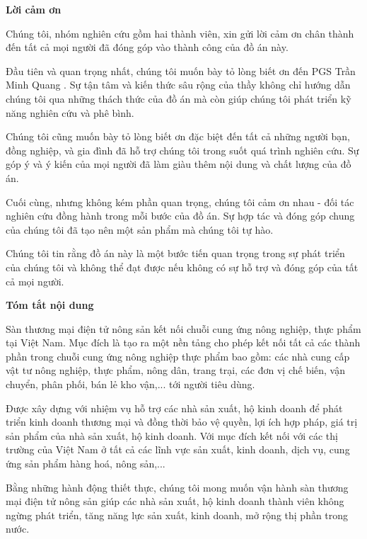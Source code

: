 \documentclass[12pt, a4paper]{report}
\theoremstyle{definition}
\newenvironment{acknowledgments}{
	\begin{center}
	  {\bfseries Lời cảm ơn}
	\end{center}
	\quotation
  }{}
\newenvironment{abstr}{
        \begin{center}
	{\bfseries Tóm tắt nội dung}
        \end{center}
        \quotation
    }{}
\newcommand{\Proc}{PGS Trần Minh Quang }
\begin{document}
\begin{acknowledgments}

Chúng tôi, nhóm nghiên cứu gồm hai thành viên, xin gửi lời cảm ơn chân thành đến tất cả mọi người đã đóng góp vào thành công của đồ án này.

Đầu tiên và quan trọng nhất, chúng tôi muốn bày tỏ lòng biết ơn đến \Proc. Sự tận tâm và kiến thức sâu rộng của thầy không chỉ hướng dẫn chúng tôi qua những thách thức của đồ án mà còn giúp chúng tôi phát triển kỹ năng nghiên cứu và phê bình.

Chúng tôi cũng muốn bày tỏ lòng biết ơn đặc biệt đến tất cả những người bạn, đồng nghiệp, và gia đình đã hỗ trợ chúng tôi trong suốt quá trình nghiên cứu. Sự góp ý và ý kiến của mọi người đã làm giàu thêm nội dung và chất lượng của đồ án.

Cuối cùng, nhưng không kém phần quan trọng, chúng tôi cảm ơn nhau - đối tác nghiên cứu đồng hành trong mỗi bước của đồ án. Sự hợp tác và đóng góp chung của chúng tôi đã tạo nên một sản phẩm mà chúng tôi tự hào.

Chúng tôi tin rằng đồ án này là một bước tiến quan trọng trong sự phát triển của chúng tôi và không thể đạt được nếu không có sự hỗ trợ và đóng góp của tất cả mọi người.

\end{acknowledgments}
\newpage
\begin{abstr}
Sàn thương mại điện tử nông sản kết nối chuỗi cung ứng nông nghiệp, thực phẩm tại Việt Nam. Mục đích là tạo ra một nền tảng cho phép kết nối tất cả các thành phần trong chuỗi cung ứng nông nghiệp thực phẩm bao gồm: các nhà cung cấp vật tư nông nghiệp, thực phẩm, nông dân, trang trại, các đơn vị chế biến, vận chuyển, phân phối, bán lẻ kho vận,... tới người tiêu dùng. 

Được xây dựng với nhiệm vụ hỗ trợ các nhà sản xuất, hộ kinh doanh để phát triển kinh doanh thương mại và đồng thời bảo vệ quyền, lợi ích hợp pháp, giá trị sản phẩm của nhà sản xuất, hộ kinh doanh. Với mục đích kết nối với các thị trường của Việt Nam ở tất cả các lĩnh vực sản xuất, kinh doanh, dịch vụ, cung ứng sản phẩm hàng hoá, nông sản,... 

Bằng những hành động thiết thực, chúng tôi mong muốn vận hành sàn thương mại điện tử nông sản giúp các nhà sản xuất, hộ kinh doanh thành viên không ngừng phát triển, tăng năng lực sản xuất, kinh doanh, mở rộng thị phần trong nước.

\end{abstr}	
\newpage
\tableofcontents
\newpage
\end{document}

